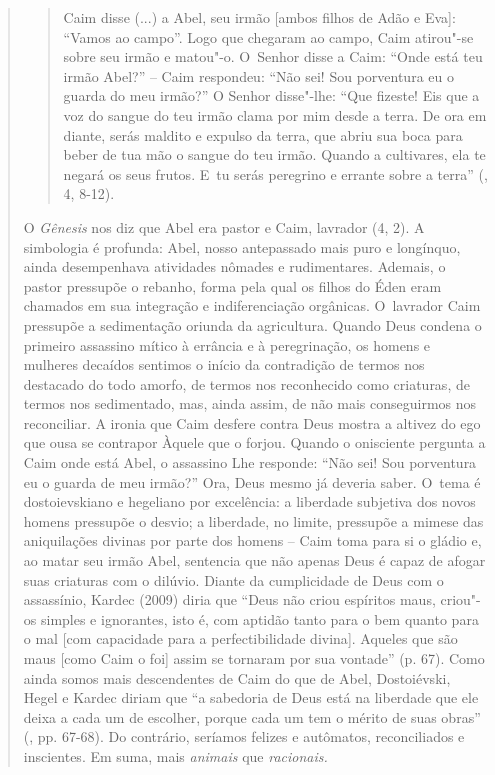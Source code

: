{\begin{quote}
\begin{quote}
Caim disse (...) a Abel, seu irmão {[}ambos filhos de Adão e Eva{]}:
``Vamos ao campo''. Logo que chegaram ao campo, Caim atirou"-se sobre seu
irmão e matou"-o. O~Senhor disse a Caim: ``Onde está teu irmão Abel?'' --
Caim respondeu: ``Não sei! Sou porventura eu o guarda do meu irmão?'' O
Senhor disse"-lhe: ``Que fizeste! Eis que a voz do sangue do teu irmão
clama por mim desde a terra. De ora em diante, serás maldito e expulso
da terra, que abriu sua boca para beber de tua mão o sangue do teu
irmão. Quando a cultivares, ela te negará os seus frutos. E~tu serás
peregrino e errante sobre a terra'' (, 4, 8-12).
\end{quote}

O \emph{Gênesis} nos diz que Abel era pastor e Caim, lavrador (4, 2). A
simbologia é profunda: Abel, nosso antepassado mais puro e longínquo,
ainda desempenhava atividades nômades e rudimentares. Ademais, o pastor
pressupõe o rebanho, forma pela qual os filhos do Éden eram chamados em
sua integração e indiferenciação orgânicas. O~lavrador Caim pressupõe a
sedimentação oriunda da agricultura. Quando Deus condena o primeiro
assassino mítico à errância e à peregrinação, os homens e mulheres
decaídos sentimos o início da contradição de termos nos destacado do
todo amorfo, de termos nos reconhecido como criaturas, de termos nos
sedimentado, mas, ainda assim, de não mais conseguirmos nos reconciliar.
A ironia que Caim desfere contra Deus mostra a altivez do ego que ousa
se contrapor Àquele que o forjou. Quando o onisciente pergunta a Caim
onde está Abel, o assassino Lhe responde: ``Não sei! Sou porventura eu o
guarda de meu irmão?'' Ora, Deus mesmo já deveria saber. O~tema é
dostoievskiano e hegeliano por excelência: a liberdade subjetiva dos
novos homens pressupõe o desvio; a liberdade, no limite, pressupõe a
mimese das aniquilações divinas por parte dos homens -- Caim toma para
si o gládio e, ao matar seu irmão Abel, sentencia que não apenas Deus é
capaz de afogar suas criaturas com o dilúvio. Diante da cumplicidade de
Deus com o assassínio, Kardec (2009) diria que ``Deus não criou
espíritos maus, criou"-os simples e ignorantes, isto é, com aptidão tanto
para o bem quanto para o mal {[}com capacidade para a perfectibilidade
divina{]}. Aqueles que são maus {[}como Caim o foi{]} assim se tornaram
por sua vontade'' (p. 67). Como ainda somos mais descendentes de Caim do
que de Abel, Dostoiévski, Hegel e Kardec diriam que ``a sabedoria de
Deus está na liberdade que ele deixa a cada um de escolher, porque cada
um tem o mérito de suas obras'' (, pp. 67-68). Do contrário,
seríamos felizes e autômatos, reconciliados e inscientes. Em suma, mais
\emph{animais} que \emph{racionais. }


\end{quote}}

